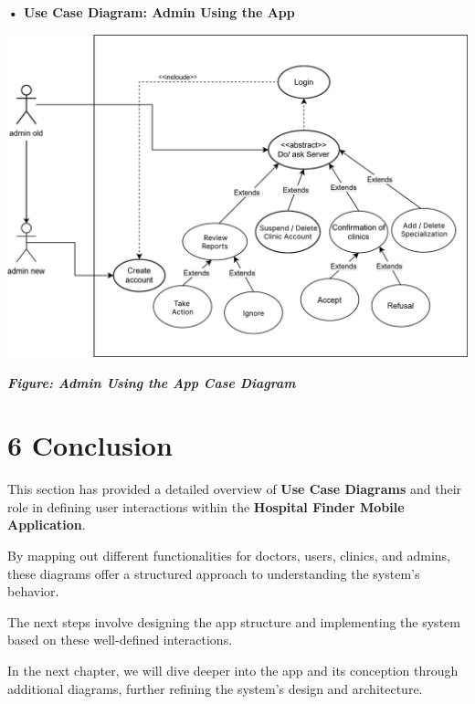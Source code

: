 \documentclass[12pt]{report}
\begin{document}
\vspace{0.5cm}
\noindent \textbf{• Use Case Diagram: Admin Using the App}
\vspace{0.6cm}
\begin{center}
	\includegraphics[width=\textwidth]{images/adminCAs@2x.pdf} %
\end{center}
\vspace{-0.35cm}
\begin{center}
	\textit{\textbf{Figure: Admin Using the App Case Diagram}}
\end{center}

\newpage
\section*{\textbf{6 Conclusion}}

\noindent This section has provided a detailed overview of \textbf{Use Case Diagrams} and their role in defining user interactions within the \textbf{Hospital Finder Mobile Application}.\vspace{0.5cm}

\noindent By mapping out different functionalities for doctors, users, clinics, and admins, these diagrams offer a structured approach to understanding the system's behavior.\vspace{0.5cm}

\noindent The next steps involve designing the app structure and implementing the system based on these well-defined interactions.\vspace{0.5cm}

\noindent In the next chapter, we will dive deeper into the app and its conception through additional diagrams, further refining the system's design and architecture.
\end{document}
